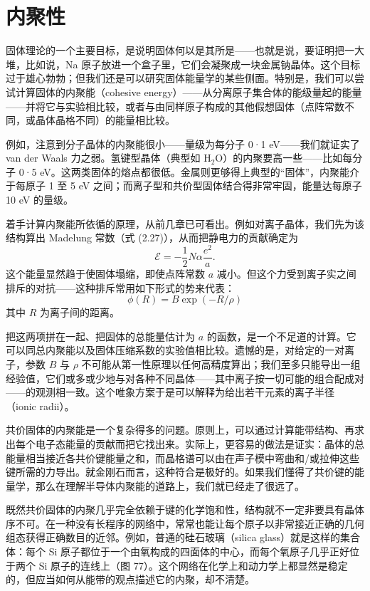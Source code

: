 
\section{内聚性}

固体理论的一个主要目标，是说明固体何以是其所是——也就是说，要证明把一大堆，比如说，Na 原子放进一个盒子里，它们会凝聚成一块金属钠晶体。这个目标过于雄心勃勃；但我们还是可以研究固体能量学的某些侧面。特别是，我们可以尝试计算固体的内聚能（cohesive energy）——从分离原子集合体的能级量起的能量——并将它与实验相比较，或者与由同样原子构成的其他假想固体（点阵常数不同，或晶体晶格不同）的能量相比较。

例如，注意到分子晶体的内聚能很小——量级为每分子 0·1 eV——我们就证实了 van der Waals 力之弱。氢键型晶体（典型如 H$_2$O）的内聚要高一些——比如每分子 0·5 eV。这两类固体的熔点都很低。金属则更够得上典型的“固体”，内聚能介于每原子 1 至 5 eV 之间；而离子型和共价型固体结合得非常牢固，能量达每原子 10 eV 的量级。

着手计算内聚能所依循的原理，从前几章已可看出。例如对离子晶体，我们先为该结构算出 Madelung 常数（式 (2.27)），从而把静电力的贡献确定为
\begin{equation*}
\mathcal{E}=-\frac{1}{2}N\alpha\frac{e^{2}}{a}.
\tag{4.1}
\end{equation*}
这个能量显然趋于使固体塌缩，即使点阵常数 $a$ 减小。但这个力受到离子实之间排斥的对抗——这种排斥常用如下形式的势来代表：
\begin{equation*}
\phi(R)=B\exp(-R/\rho)
\tag{4.2}
\end{equation*}
其中 $R$ 为离子间的距离。

把这两项拼在一起、把固体的总能量估计为 $a$ 的函数，是一个不足道的计算。它可以同总内聚能以及固体压缩系数的实验值相比较。遗憾的是，对给定的一对离子，参数 $B$ 与 $\rho$ 不可能从第一性原理以任何高精度算出；我们至多只能导出一组经验值，它们或多或少地与对各种不同晶体——其中离子按一切可能的组合配成对——的观测相一致。这个唯象方案于是可以解释为给出若干元素的离子半径（ionic radii）。

共价固体的内聚能是一个复杂得多的问题。原则上，可以通过计算能带结构、再求出每个电子态能量的贡献而把它找出来。实际上，更容易的做法是证实：晶体的总能量相当接近各共价键能量之和，而晶格谱可以由在声子模中弯曲和/或拉伸这些键所需的力导出。就金刚石而言，这种符合是极好的。如果我们懂得了共价键的能量学，那么在理解半导体内聚能的道路上，我们就已经走了很远了。

既然共价固体的内聚几乎完全依赖于键的化学饱和性，结构就不一定非要具有晶体序不可。在一种没有长程序的网络中，常常也能让每个原子以非常接近正确的几何组态获得正确数目的近邻。例如，普通的硅石玻璃（silica glass）就是这样的集合体：每个 Si 原子都位于一个由氧构成的四面体的中心，而每个氧原子几乎正好位于两个 Si 原子的连线上（图 77）。这个网络在化学上和动力学上都显然是稳定的，但应当如何从能带的观点描述它的内聚，却不清楚。

